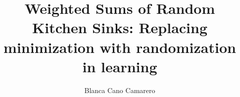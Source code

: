 \title{Weighted Sums of Random Kitchen Sinks: Replacing
minimization with randomization in learning}
\author{Blanca Cano Camarero}


\relax
{}\relax
{}\relax

\newcommand{\bgcolor}{blue}